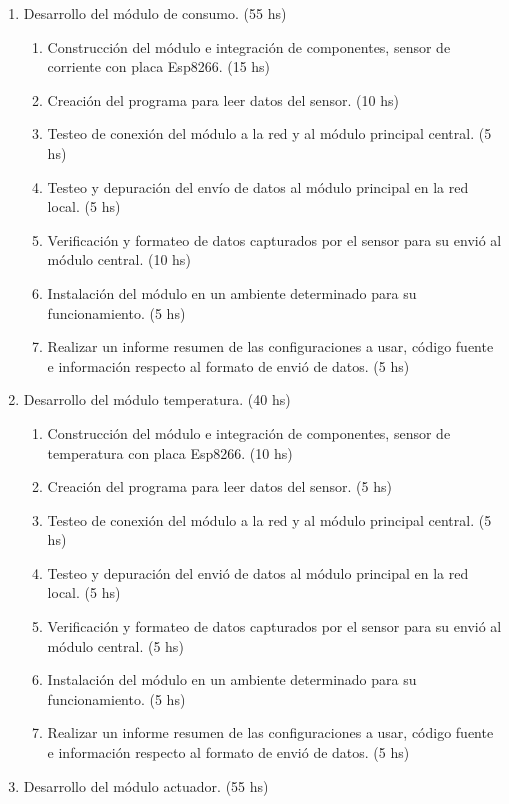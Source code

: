 \documentclass[11pt]{charter}
\begin{document}
\begin{enumerate}
\item Desarrollo del módulo de consumo. (55 hs)
	\begin{enumerate}
	\item Construcción del módulo e integración de componentes, sensor de corriente con placa Esp8266. (15 hs)
	\item Creación del programa para leer datos del sensor. (10 hs)
	\item Testeo de conexión del módulo a la red y al módulo principal central. (5 hs)
	\item Testeo y depuración del envío de datos al módulo principal en la red local. (5 hs)
	\item Verificación y formateo de datos capturados por el sensor para su envió al módulo central. (10 hs)
	\item Instalación del módulo en un ambiente determinado para su funcionamiento. (5 hs)
	\item Realizar un informe resumen de las configuraciones a usar, código fuente e información respecto al formato de envió de datos. (5 hs)
	\end{enumerate}
\item Desarrollo del módulo temperatura. (40 hs)
	\begin{enumerate}
	\item Construcción del módulo e integración de componentes, sensor de temperatura con placa Esp8266. (10 hs)
	\item Creación del programa para leer datos del sensor. (5 hs)
	\item Testeo de conexión del módulo a la red y al módulo principal central. (5 hs)
	\item Testeo y depuración del envió de datos al módulo principal en la red local. (5 hs)
	\item Verificación y formateo de datos capturados por el sensor para su envió al módulo central. (5 hs)
	\item Instalación del módulo en un ambiente determinado para su funcionamiento. (5 hs)
	\item Realizar un informe resumen de las configuraciones a usar, código fuente e información respecto al formato de envió de datos. (5 hs)
	\end{enumerate}
\item Desarrollo del módulo actuador. (55 hs)

\end{enumerate}
\end{document}
